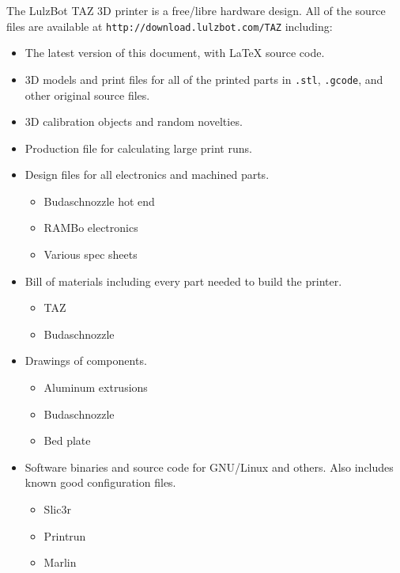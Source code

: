 %
%
%
%
%

The LulzBot\textsuperscript{\miniscule{\texttrademark}} TAZ 3D printer is a free/libre hardware design. All of the source files are available at \texttt{http://download.lulzbot.com/TAZ} including:

\begin{itemize}
\item The latest version of this document, with {\LaTeX} source code.

\item 3D models and print files for all of the printed parts in \texttt{.stl}, \texttt{.gcode}, and other original source files.

\item 3D calibration objects and random novelties.

\item Production file for calculating large print runs.

\item Design files for all electronics and machined parts.

\begin{itemize} %
\item Budaschnozzle hot end
\item RAMBo electronics
\item Various spec sheets
\end{itemize} %

\item Bill of materials including every part needed to build the printer.
\begin{itemize} %
\item TAZ
\item Budaschnozzle
\end{itemize} %

\item Drawings of components.
\begin{itemize} %
\item Aluminum extrusions
\item Budaschnozzle
\item Bed plate
\end{itemize} %

\item Software binaries and source code for GNU/Linux and others. Also includes known good configuration files.
\begin{itemize} %
\item Slic3r
\item Printrun
\item Marlin
\end{itemize} %

\end{itemize}

